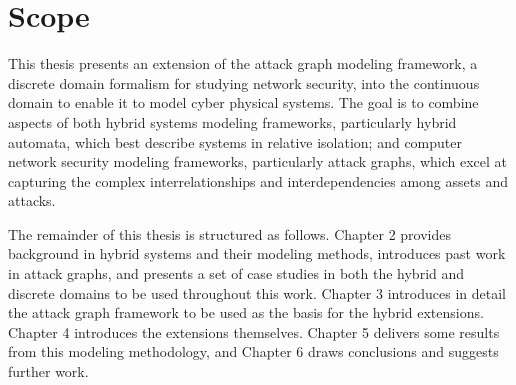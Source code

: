\section{Scope}
This thesis presents an extension of the attack graph modeling framework, 
a discrete domain formalism for studying network security, into the 
continuous domain to enable it to model cyber
physical systems. The goal is to combine aspects of both hybrid systems
modeling frameworks, particularly hybrid automata, which best describe systems in 
relative isolation; and computer network security modeling frameworks, particularly attack graphs,
which excel at capturing the complex interrelationships and interdependencies among assets and
attacks.

The remainder of this thesis is structured as follows. Chapter 2 provides background in hybrid systems
and their modeling methods, introduces past work in attack graphs, and presents a set of case studies
in both the hybrid and discrete domains to be used throughout this work. Chapter 3 introduces in detail
the attack graph framework to be used as the basis for the hybrid extensions. Chapter 4
introduces the extensions themselves. Chapter 5 delivers some results from this modeling methodology,
and Chapter 6 draws conclusions and suggests further work.